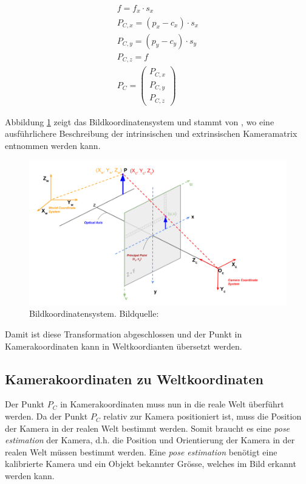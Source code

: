 \begin{align}
f = f_x \cdot s_x\\
P_{C,x} = (p_x - c_x) \cdot s_x\\
P_{C,y} = (p_y - c_y) \cdot s_y\\
P_{C,z} = f\\
P_C = \begin{pmatrix}P_{C,x}\\P_{C,y}\\P_{C,z}\end{pmatrix}
\end{align}

Abbildung \ref{fig:camera_projection_learnopencv} zeigt das Bildkoordinatensystem und stammt
von \cite{learnopencv:geometry_of_image_formation},
wo eine ausführlichere Beschreibung der intrinsischen und extrinsischen Kameramatrix entnommen werden kann.

\begin{figure}[h!]
    \includegraphics[width=0.8\linewidth]{../common/resources/coordinate_systems/camera_projection_learnopencv.png}
    \caption{Bildkoordinatensystem. Bildquelle: \cite{learnopencv:geometry_of_image_formation}}
    \label{fig:camera_projection_learnopencv}
\end{figure}

Damit ist diese Transformation abgeschlossen und der Punkt in Kamerakoordinaten kann in Weltkoordianten übersetzt werden.

\subsection{Kamerakoordinaten zu Weltkoordinaten}\label{kap:camera_to_world}

Der Punkt $P_C$ in Kamerakoordinaten muss nun in die reale Welt überführt werden. Da der Punkt $P_C$ relativ zur Kamera
positioniert ist, muss die Position der Kamera in der realen Welt bestimmt werden.
Somit braucht es eine \emph{pose estimation} der Kamera, d.h. die Position und Orientierung der Kamera in der realen Welt müssen bestimmt werden.
Eine \emph{pose estimation} benötigt eine kalibrierte Kamera und ein Objekt bekannter Grösse, welches im Bild erkannt werden kann.

